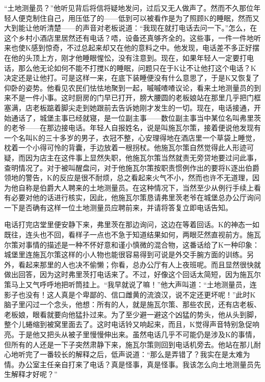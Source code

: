 \documentclass[12pt,a4paper]{article}
\begin{document}
“土地测量员？”他听见背后将信将疑地发问，过后又无人做声了。然而不久那位年轻人便克制住自己，用压低了的——低到可以被看作是为了照顾K的睡眠，然而又大到能让他听清楚——的声音对老板说道：“我现在就打电话去问一下。”怎么，在这个乡村小酒店里居然还有电话？唔，设备还真够齐全的。这些事，一件一件地听来也使K感到惊奇，不过总起来却又在他的意料之中。他发现，电话差不多正好摆在他的头顶上方，刚才他睡眼惺忪，没有注意到。现在，如果年轻人一定要打电话，那么他无论如何不能不打搅K的睡眠，问题只在于K让不让他打这个电话？K决定还是让他打。可是这样一来，在底下装睡便没有什么意思了，于是K又恢复了仰卧的姿势。他看见农民们怯怯地聚到一起，嘁嘁喳喳议论，看来土地测量员的到来不是一件小事。这时厨房的门早已打开，膀大腰圆的老板娘站在那里几乎把门框塞满，店老板踮着脚尖走到她跟前去告诉她刚才发生的一切。现在，电话接通，开始通话了，城堡主事已经就寝，是一位副主事——数位副主事当中某位名叫弗里茨的老爷——在那边接电话。年轻人自报姓名，说是叫施瓦尔策，接着便说他发现有一个名叫K的三十多岁的男子，衣冠不整，心安理得地在酒店里一个草袋上睡觉，枕着一个小得可怜的背囊，手边放着一根拐杖。他施瓦尔策自然觉得此人形迹可疑，而因为店主在这件事上显然失职，他施瓦尔策当然就责无旁贷地要过问此事，查明情况了。对于被叫醒盘问，对于他施瓦尔策按职责惯例作出的要将K逐出伯爵领地的警告，K的反应是很不耐烦，总之看起来火气不小，然而也许不无道理，因为他自称是伯爵大人聘来的土地测量员。在这种情况下，当然至少从例行手续上看有必要对他的话进行核实，因此，他施瓦尔策恳请弗里茨老爷在城堡总办公厅询问一下是否确有这样一位土地测量员应聘前来，并请将答复立即电话告知。

电话打完店堂里便安静下来，弗里茨在那边询问，这边在等着回话。K的神态一如既往，连头也不回，看样子一点也不急于知道结果如何，两眼茫然直视前方。施瓦尔策对事情的描述是一种不怀好意和谨小慎微的混合物，这番话给了K一种印象：城堡里连施瓦尔策这样的小人物也能很容易得到可说是外交手腕方面的训练。另外，看起来那里的人也决不偷懒；你看，总办公厅有人上夜班呢。而且显然很快就做出回答，因为这时弗里茨打电话来了。不过，好像这个回话太简短，因为施瓦尔策马上又气呼呼地把听筒挂上。“我早就说了嘛！”他大声叫道：“土地测量员，连影子也没有！这人真是个卑鄙的、信口雌黄的流浪汉，说不定还更坏呢！”此时K脑子里闪过一个念头，他想：所有的人，就是施瓦尔策、那些农民，还有店老板、老板娘，眼看就要向他猛扑过来。为了至少避一避这个凶猛的势头，他从头到脚，整个儿蜷缩到被窝里面去了。这时电话铃又响起来，而且，K觉得声音特别急促响亮。于是他又把头从被子里慢慢伸出来。虽然电话几乎不可能仍是涉及K的事情，但所有的人还是一下子突然肃静下来，施瓦尔策则回到电话机旁去。他站在那儿耐心地听完了一番较长的解释之后，低声说道：“那么是弄错了？我实在是太难为情。办公室主任亲自打来了电话？真是怪事，真是怪事。我该怎么向土地测量员先生解释才好呢？”
\end{document}
